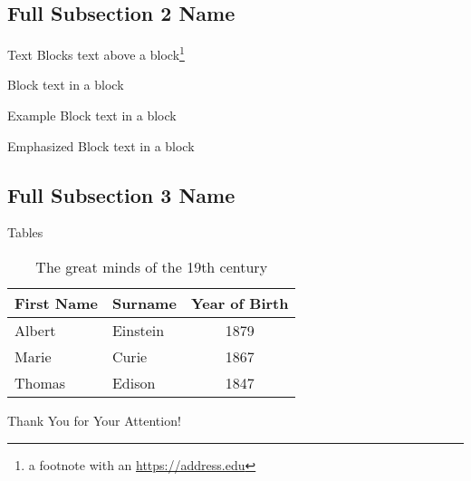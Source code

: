 \documentclass[
  aspectratio=169,
]{beamer}
\begin{document}
\subsection[Short Subsection 2 Name]{Full Subsection 2 Name}

\begin{frame}{Text Blocks}
text above a block\footnote{a footnote with an \url{https://address.edu}}
\begin{block}{Block}
  text in a block
\end{block}
\begin{exampleblock}{Example Block}
  text in a block
\end{exampleblock}
\begin{alertblock}{Emphasized Block}
  text in a block
\end{alertblock}
\end{frame}

\subsection[Short Subsection 3 Name]{Full Subsection 3 Name}

\begin{frame}{Tables}
\begin{table}
  \begin{tabular}{llc}
    First Name & Surname & Year of Birth \\ \midrule
    Albert & Einstein & 1879 \\
    Marie & Curie & 1867 \\
    Thomas & Edison & 1847 \\
  \end{tabular}
  \caption{The great minds of the 19th century}
\end{table}
\end{frame}

\begin{frame}[plain]
\vfill
\centerline{Thank You for Your Attention!}
\vfill\vfill
\end{frame}
\end{document}
